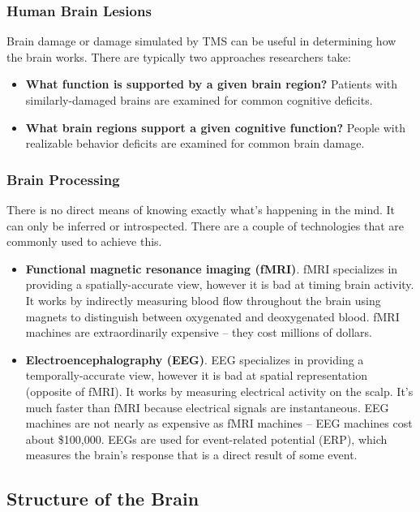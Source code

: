 \documentclass[]{article}
\begin{document}
			\subsubsection{Human Brain Lesions}
				Brain damage or damage simulated by TMS can be useful in determining how the brain works. There are typically two approaches researchers take:
				\begin{itemize}
					\item \textbf{What function is supported by a given brain region?} Patients with similarly-damaged brains are examined for common cognitive deficits.
					\item \textbf{What brain regions support a given cognitive function?} People with realizable behavior deficits are examined for common brain damage.
				\end{itemize}
			\subsubsection{Brain Processing}
				There is no direct means of knowing exactly what's happening in the mind. It can only be inferred or introspected. There are a couple of technologies that are commonly used to achieve this.
				\begin{itemize}
					\item \textbf{Functional magnetic resonance imaging (fMRI)}. fMRI specializes in providing a spatially-accurate view, however it is bad at timing brain activity. It works by indirectly measuring blood flow throughout the brain using magnets to distinguish between oxygenated and deoxygenated blood. fMRI machines are extraordinarily expensive -- they cost millions of dollars.
					\item \textbf{Electroencephalography (EEG)}. EEG specializes in providing a temporally-accurate view, however it is bad at spatial representation (opposite of fMRI). It works by measuring electrical activity on the scalp. It's much faster than fMRI because electrical signals are instantaneous. EEG machines are not nearly as expensive as fMRI machines -- EEG machines cost about \$100,000. EEGs are used for event-related potential (ERP), which measures the brain's response that is a direct result of some event.
				\end{itemize}
		\subsection{Structure of the Brain}
\end{document}
